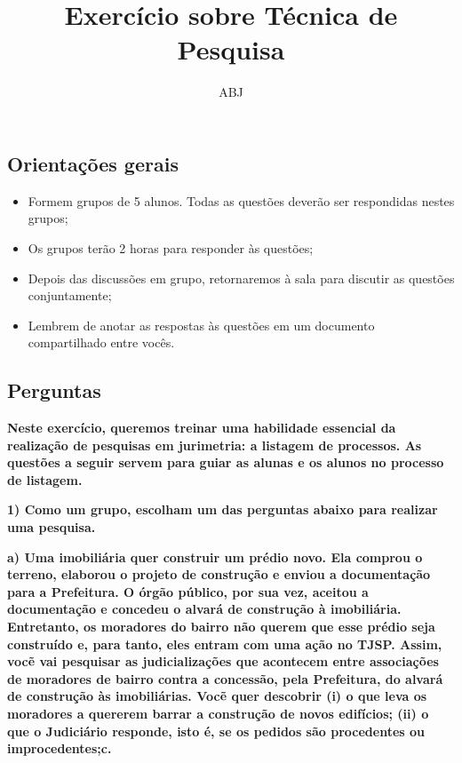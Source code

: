 \documentclass[
  letterpaper,
  DIV=11,
  numbers=noendperiod]{scrartcl}
\title{Exercício sobre Técnica de Pesquisa}
\author{ABJ}
\date{}
\providecommand{\tightlist}{%
  \setlength{\itemsep}{0pt}\setlength{\parskip}{0pt}}\usepackage{longtable,booktabs,array}
\begin{document}
\maketitle
\ifdefined\Shaded\renewenvironment{Shaded}{\begin{tcolorbox}[breakable, sharp corners, interior hidden, borderline west={3pt}{0pt}{shadecolor}, boxrule=0pt, enhanced, frame hidden]}{\end{tcolorbox}}\fi

\hypertarget{orientauxe7uxf5es-gerais}{%
\subsection{Orientações gerais}\label{orientauxe7uxf5es-gerais}}

\begin{itemize}
\tightlist
\item
  Formem grupos de 5 alunos. Todas as questões deverão ser respondidas
  nestes grupos;
\item
  Os grupos terão 2 horas para responder às questões;
\item
  Depois das discussões em grupo, retornaremos à sala para discutir as
  questões conjuntamente;
\item
  Lembrem de anotar as respostas às questões em um documento
  compartilhado entre vocês.
\end{itemize}

\newpage{}

\hypertarget{perguntas}{%
\subsection{Perguntas}\label{perguntas}}

\textbf{Neste exercício, queremos treinar uma habilidade essencial da
realização de pesquisas em jurimetria: a listagem de processos. As
questões a seguir servem para guiar as alunas e os alunos no processo de
listagem.}

\textbf{1) Como um grupo, escolham um das perguntas abaixo para realizar
uma pesquisa.}

\textbf{a) Uma imobiliária quer construir um prédio novo. Ela comprou o
terreno, elaborou o projeto de construção e enviou a documentação para a
Prefeitura. O órgão público, por sua vez, aceitou a documentação e
concedeu o alvará de construção à imobiliária. Entretanto, os moradores
do bairro não querem que esse prédio seja construído e, para tanto, eles
entram com uma ação no TJSP. Assim, vocẽ vai pesquisar as
judicializações que acontecem entre associações de moradores de bairro
contra a concessão, pela Prefeitura, do alvará de construção às
imobiliárias. Vocẽ quer descobrir (i) o que leva os moradores a quererem
barrar a construção de novos edifícios; (ii) o que o Judiciário
responde, isto é, se os pedidos são procedentes ou improcedentes;c.}
\end{document}

